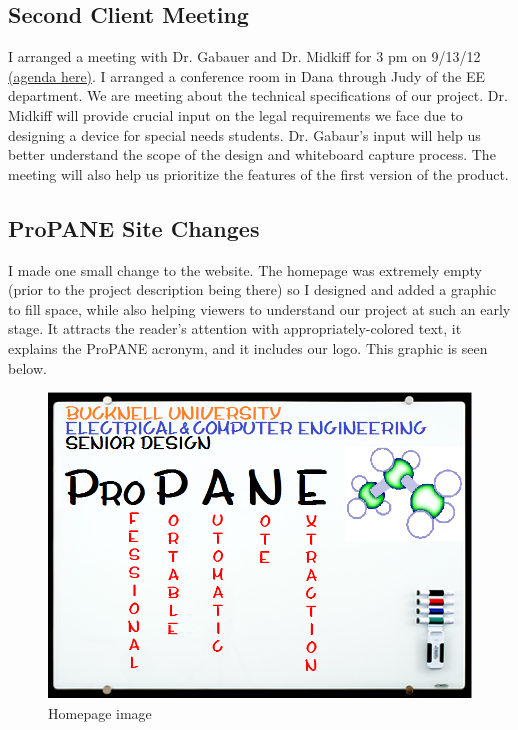\documentclass[]{article}
\begin{document}
{		\subsection*{Second Client Meeting}
		I arranged a meeting with Dr. Gabauer and Dr. Midkiff for 3 pm on 9/13/12 \href{https://docs.google.com/viewer?a=v&pid=sites&srcid=ZGVmYXVsdGRvbWFpbnxidXByb3BhbmV8Z3g6NDMwMGY4NTlmYWQ2NjUx}{(agenda here)}.  I arranged a conference room in Dana through Judy of the EE department.  We are meeting about the technical specifications of our project.  Dr. Midkiff will provide crucial input on the legal requirements we face due to designing a device for special needs students.  Dr. Gabaur's input will help us better understand the scope of the design and whiteboard capture process. The meeting will also help us prioritize the features of the first version of the product.

		\subsection*{ProPANE Site Changes}
		I made one small change to the website.  The homepage was extremely empty (prior to the project description being there) so I designed and added a graphic to fill space, while also helping viewers to understand our project at such an early stage.  It attracts the reader's attention with appropriately-colored text, it explains the ProPANE acronym, and it includes our logo.  This graphic is seen below.

\begin{figure}[H]
\centering
\includegraphics[scale=0.36]{images/propane_whiteboard}
\caption{Homepage image}
\end{figure}
 

}
\end{document}
